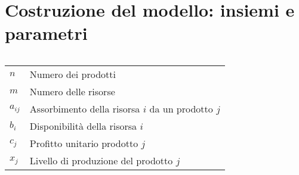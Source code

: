 \documentclass{beamer}
\def\lyxframeend{} %
\begin{document}
\generatitolo

\lyxframeend{}

\lyxframeend{}\section{Costruzione del modello: insiemi e parametri}

\lyxframeend{}
\begin{columns}%


\begin{tabular}{lp{}}
\color{magenta}$n$		&Numero dei prodotti\\
\color{magenta}$m$		&Numero delle risorse\\
\color{magenta}$a_{ij}$	&Assorbimento della risorsa $i$ da un prodotto $j$\\
\color{magenta}$b_{i}$ 	&Disponibilit\`a della risorsa $i$\\
\color{magenta}$c_{j}$	&Profitto unitario prodotto $j$\\
\color{magenta}$x_{j}$	&Livello di produzione del prodotto $j$
\end{tabular}



\end{columns}%
\end{document}
